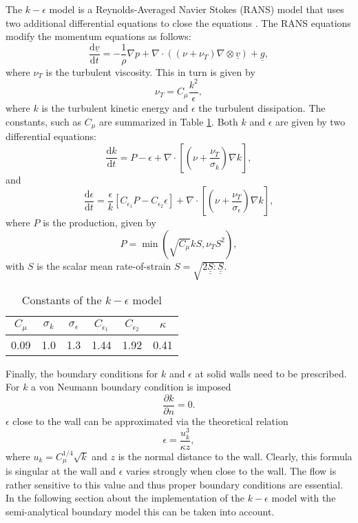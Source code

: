 \documentclass[12pt]{memoir}
\newcommand{\uvec}[1]{\underline{#1}}
\newcommand{\td}{\text{d}}
\newcommand{\tdv}[2]{\frac{\td #1}{\td #2}}
\newcommand{\pdv}[2]{\frac{\partial #1}{\partial #2}}
\begin{document}
The $k-\epsilon$ model is a Reynolds-Averaged Navier Stokes (RANS) model that
uses two additional differential equations to close the equations
\cite{pope_turbulent_2001}. The RANS equations modify the momentum
equations as follows:
\begin{equation}
\tdv{\uvec{v}}{t} = - \frac{1}{\rho}\nabla p + \nabla \cdot ( (\nu +
\nu_T) \nabla \otimes \uvec{v}) + \uvec{g},
\label{e:turb:ns}
\end{equation}
where $\nu_T$ is the turbulent viscosity. This in turn is given by
\begin{equation}
\nu_T = C_\mu \frac{k^2}{\epsilon},
\label{e:turb:nut}
\end{equation}
where $k$ is the turbulent kinetic energy and $\epsilon$ the turbulent
dissipation. The constants, such as $C_\mu$ are summarized in Table
\ref{tab:turb:consts}. Both $k$ and $\epsilon$ are given by two
differential equations:
\begin{equation}
\tdv{k}{t} = P - \epsilon + \nabla \cdot \left[  \left(\nu +
\frac{\nu_T}{\sigma_k}\right) \nabla k\right],
\label{e:turb:k}
\end{equation}
and
\begin{equation}
\tdv{\epsilon}{t} =\frac{\epsilon}{k}\left[ C_{\epsilon_1} P -
C_{\epsilon_2} \epsilon \right]+ \nabla \cdot \left[  \left(\nu +
\frac{\nu_T}{\sigma_\epsilon}\right) \nabla k\right],
\label{e:turb:eps}
\end{equation}
where $P$ is the production, given by
\begin{equation}
P = \min(\sqrt{C_\mu} k S, \nu_T S^2),
\label{e:turb:strain}
\end{equation}
with $S$ is the scalar mean rate-of-strain $S = \sqrt{2 \uvec{\uvec{S}}
: \uvec{\uvec{S}}}$.
\begin{table}
\centering
\begin{tabular}{| c | c | c | c | c | c |}
\hline
$C_\mu$ & $\sigma_k$ & $\sigma_\epsilon$ & $C_{\epsilon_1}$ &
$C_{\epsilon_2}$ & $\kappa$
\\
\hline
0.09 & 1.0 & 1.3 & 1.44 & 1.92 & 0.41
\\
\hline
\end{tabular}
\caption{Constants of the $k-\epsilon$ model}
\label{tab:turb:consts}
\end{table}
Finally, the boundary conditions for $k$ and $\epsilon$ at solid walls
need to be prescribed. For $k$ a von Neumann boundary condition is
imposed
\begin{equation}
\pdv{k}{n} = 0.
\label{e:turb:k-bound}
\end{equation}
$\epsilon$ close to the wall can be approximated via the theoretical
relation
\begin{equation}
\epsilon = \frac{u_k^3}{\kappa z},
\label{e:turb:eps-nearwall}
\end{equation}
where $u_k = C_\mu^{1/4} \sqrt{k}$ and $z$ is the normal distance to the
wall. Clearly, this formula is singular at the wall and $\epsilon$
varies strongly when close to the wall. The flow is rather sensitive to
this value and thus proper boundary conditions are essential. In the
following section about the implementation of the $k-\epsilon$ model
with the semi-analytical boundary model this can be taken into account.
\end{document}
